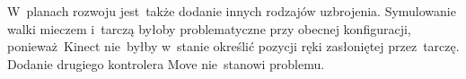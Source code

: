 W~planach rozwoju jest~także dodanie innych rodzajów uzbrojenia. 
Symulowanie walki mieczem i~tarczą byłoby problematyczne przy obecnej konfiguracji, 
ponieważ~Kinect nie~byłby w~stanie określić pozycji ręki zasłoniętej przez~tarczę. 
Dodanie drugiego kontrolera Move nie~stanowi problemu.

